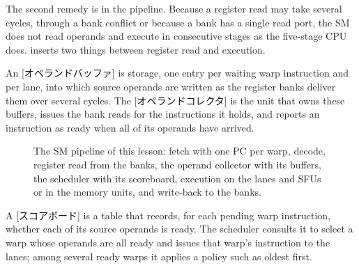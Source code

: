 \documentclass[../main.tex]{subfiles}
\begin{document}
The second remedy is in the pipeline.  Because a register read may take
several cycles, through a bank conflict or because a bank has a single
read port, the SM does not read operands and execute in consecutive
stages as the five-stage CPU does.   inserts two
things between register read and execution.

\begin{definition}
  \label{def:l04-operand-collector}
  An [オペランドバッファ] is storage, one entry per
  waiting warp instruction and per lane, into which source operands are
  written as the register banks deliver them over several cycles.  The
  [オペランドコレクタ] is the unit that owns these
  buffers, issues the bank reads for the instructions it holds, and
  reports an instruction as ready when all of its operands have
  arrived.
\end{definition}

\begin{figure}[htbp]
  \centering
  
  \caption{The SM pipeline of this lesson: fetch with one PC per warp,
    decode, register read from the banks, the operand collector with
    its buffers, the scheduler with its scoreboard, execution on the
    lanes and SFUs or in the memory units, and write-back to the
    banks.}
  \label{fig:l04-pipeline}
\end{figure}

\begin{definition}[Scoreboard]
  \label{def:l04-scoreboard}
  A [スコアボード] is a table that records, for each
  pending warp instruction, whether each of its source operands is
  ready.  The scheduler consults it to select a warp whose operands are
  all ready and issues that warp's instruction to the lanes; among
  several ready warps it applies a policy such as oldest first.
\end{definition}
\end{document}
